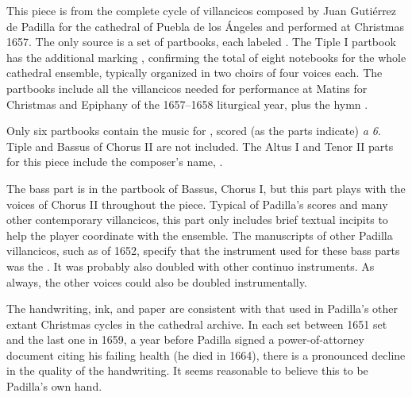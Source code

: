 
\begin{notesources}

\begin{source}
\end{source}

\begin{source}
\end{source}

\end{notesources}

This piece is from the complete cycle of villancicos composed by Juan Gutiérrez de Padilla for the cathedral of Puebla de los Ángeles and performed at Christmas 1657.
The only source is a set of partbooks, each labeled .
The Tiple I partbook has the additional marking , confirming the total of eight notebooks for the whole cathedral ensemble, typically organized in two choirs of four voices each.
The partbooks include all the villancicos needed for performance at Matins for Christmas and Epiphany of the 1657--1658 liturgical year, plus the hymn .

Only six partbooks contain the music for , scored (as the parts indicate) \emph{a 6}.
Tiple and Bassus of Chorus II are not included.
The Altus I and Tenor II parts for this piece include the composer's name, .

The bass part is in the partbook of Bassus, Chorus I, but this part plays with the voices of Chorus II throughout the piece.
Typical of Padilla's scores and many other contemporary villancicos, this part only includes brief textual incipits to help the player coordinate with the ensemble.
The manuscripts of other Padilla villancicos, such as  of 1652, specify that the instrument used for these bass parts was the .
It was probably also doubled with other continuo instruments.
As always, the other voices could also be doubled instrumentally.

The handwriting, ink, and paper are consistent with that used in Padilla's other extant Christmas cycles in the cathedral archive.
In each set between 1651 set and the last one in 1659, a year before Padilla signed a power-of-attorney document citing his failing health\autocite{Mauleon:PadillaCivil} (he died in 1664), there is a pronounced decline in the quality of the handwriting.
It seems reasonable to believe this to be Padilla's own hand.


